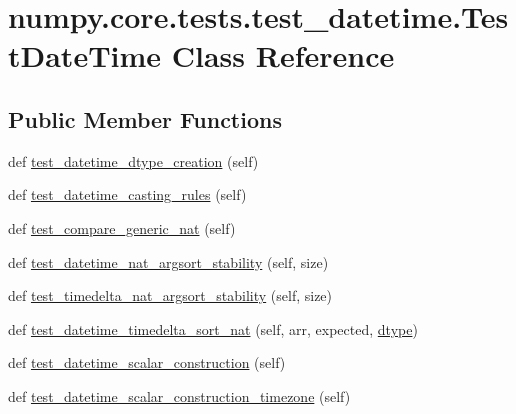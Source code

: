 \hypertarget{classnumpy_1_1core_1_1tests_1_1test__datetime_1_1TestDateTime}{}\section{numpy.\+core.\+tests.\+test\+\_\+datetime.\+Test\+Date\+Time Class Reference}
\label{classnumpy_1_1core_1_1tests_1_1test__datetime_1_1TestDateTime}
\subsection*{Public Member Functions}
\begin{DoxyCompactItemize}
\item 
def \hyperlink{classnumpy_1_1core_1_1tests_1_1test__datetime_1_1TestDateTime_a2b5e27b3b632b9027f90c5de18b3f940}{test\+\_\+datetime\+\_\+dtype\+\_\+creation} (self)
\item 
def \hyperlink{classnumpy_1_1core_1_1tests_1_1test__datetime_1_1TestDateTime_a7b4ed57d9540cbdd8ef4f36a2d0ff327}{test\+\_\+datetime\+\_\+casting\+\_\+rules} (self)
\item 
def \hyperlink{classnumpy_1_1core_1_1tests_1_1test__datetime_1_1TestDateTime_a1437a7923b5d23622090e5979ab92a39}{test\+\_\+compare\+\_\+generic\+\_\+nat} (self)
\item 
def \hyperlink{classnumpy_1_1core_1_1tests_1_1test__datetime_1_1TestDateTime_a8ccec657032609c91a1beb1ab20807a4}{test\+\_\+datetime\+\_\+nat\+\_\+argsort\+\_\+stability} (self, size)
\item 
def \hyperlink{classnumpy_1_1core_1_1tests_1_1test__datetime_1_1TestDateTime_a1a659cfd818a020595f77c2960424ddb}{test\+\_\+timedelta\+\_\+nat\+\_\+argsort\+\_\+stability} (self, size)
\item 
def \hyperlink{classnumpy_1_1core_1_1tests_1_1test__datetime_1_1TestDateTime_aa9a08f9092f6381314d3aa49ccfb29e1}{test\+\_\+datetime\+\_\+timedelta\+\_\+sort\+\_\+nat} (self, arr, expected, \hyperlink{classnumpy_1_1core_1_1tests_1_1test__datetime_1_1TestDateTime_a2616828fb8238470489cc1e5ef823c55}{dtype})
\item 
def \hyperlink{classnumpy_1_1core_1_1tests_1_1test__datetime_1_1TestDateTime_ac43d76ceb1f247de4728528814dae911}{test\+\_\+datetime\+\_\+scalar\+\_\+construction} (self)
\item 
def \hyperlink{classnumpy_1_1core_1_1tests_1_1test__datetime_1_1TestDateTime_abd71b40921f568d583e18b0dc0fc2c62}{test\+\_\+datetime\+\_\+scalar\+\_\+construction\+\_\+timezone} (self)

\end{DoxyCompactItemize}
